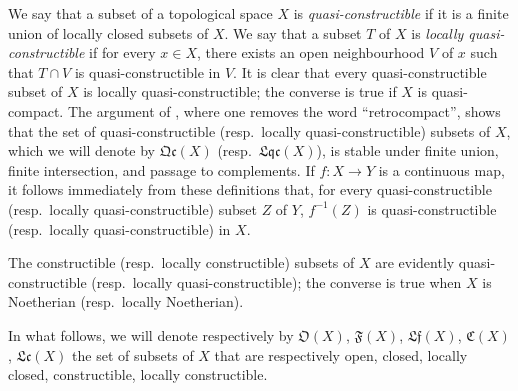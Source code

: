 \begin{env}[10.1.1]
\label{IV.10.1.1}
We say that a subset of a topological space $X$ is \emph{quasi-constructible} if it is a finite union of locally closed subsets of $X$.
We say that a subset $T$ of $X$ is \emph{locally quasi-constructible} if for every $x\in X$, there exists an open neighbourhood $V$ of $x$ such that $T\cap V$ is quasi-constructible in $V$.
It is clear that every quasi-constructible subset of $X$ is locally quasi-constructible; the converse is true if $X$ is quasi-compact.
The argument of , where one removes the word ``retrocompact'', shows that the set of quasi-constructible (resp.\ locally quasi-constructible) subsets of $X$, which we will denote by $\mathfrak{Qc}(X)$ (resp.\ $\mathfrak{Lqc}(X)$), is stable under finite union, finite intersection, and passage to complements.
If $f:X\to Y$ is a continuous map, it follows immediately from these definitions that, for every quasi-constructible (resp.\ locally quasi-constructible) subset $Z$ of $Y$, $f^{-1}(Z)$ is quasi-constructible (resp.\ locally quasi-constructible) in $X$.

The constructible (resp.\ locally constructible) subsets of $X$ are evidently quasi-constructible (resp.\ locally quasi-constructible); the converse is true when $X$ is Noetherian (resp.\ locally Noetherian).

In what follows, we will denote respectively by $\mathfrak{O}(X)$, $\mathfrak{F}(X)$, $\mathfrak{Lf}(X)$, $\mathfrak{C}(X)$, $\mathfrak{Lc}(X)$ the set of subsets of $X$ that are respectively open, closed, locally closed, constructible, locally constructible.
\end{env}


